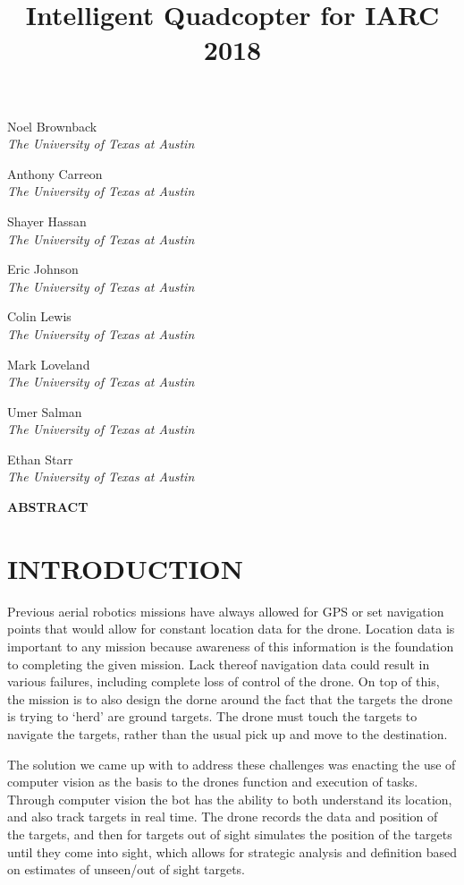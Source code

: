 \documentclass[12pt,letterpaper]{article}
\title{Intelligent Quadcopter for IARC 2018}
\newenvironment{nscenter}
 {\parskip=0pt\par\nopagebreak\centering}
 {\par\noindent\ignorespacesafterend}
\newcommand{\affiliatedauthor}[2]{
\begin{nscenter}
	#1 \\ \textit{#2}
\end{nscenter}
}
\renewcommand{\abstractname}{ABSTRACT}
\renewenvironment{abstract}
 {\vspace{-0.5ex}
	\small
	\begin{center}
		\bfseries \abstractname\vspace{-4ex}\vspace{0pt}
	\end{center}
	\list{}{
		\setlength{\leftmargin}{0.5in}
		\setlength{\rightmargin}{\leftmargin}
	}
	\item\relax}
 {\endlist}
\begin{document}
\begin{center}
	\textbf{\LARGE{\thetitle}}
\end{center}

\affiliatedauthor{Noel Brownback}{The University of Texas at Austin}
\affiliatedauthor{Anthony Carreon}{The University of Texas at Austin}
\affiliatedauthor{Shayer Hassan}{The University of Texas at Austin}
\affiliatedauthor{Eric Johnson}{The University of Texas at Austin}
\affiliatedauthor{Colin Lewis}{The University of Texas at Austin}
\affiliatedauthor{Mark Loveland}{The University of Texas at Austin}
\affiliatedauthor{Umer Salman}{The University of Texas at Austin}
\affiliatedauthor{Ethan Starr}{The University of Texas at Austin}


\begin{abstract}
\lipsum[1]
\end{abstract}


\section*{INTRODUCTION}
	Previous aerial robotics missions have always allowed for GPS or set navigation points that would allow for constant location data for the drone. Location data is important to any mission because awareness of this information is the foundation to completing the given mission. Lack thereof navigation data could result in various failures, including complete loss of control of the drone. On top of this, the mission is to also design the dorne around the fact that the targets the drone is trying to ‘herd’ are ground targets.   The drone must touch the targets to navigate the targets, rather than the usual pick up and move to the destination.

	The solution we came up with to address these challenges was enacting the use of computer vision as the basis to the drones function and execution of tasks. Through computer vision the bot has the ability to both understand its location, and also track targets in real time. The drone records the data and position of the targets, and then for targets out of sight simulates the position of the targets until they come into sight, which allows for strategic analysis and definition based on estimates of unseen/out of sight targets. 
\end{document}
